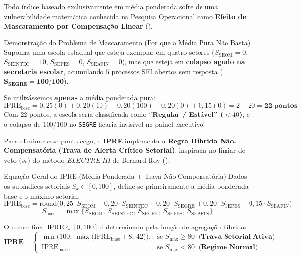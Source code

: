 \documentclass[9pt,a4paper]{extarticle}
\begin{document}
Todo índice baseado exclusivamente em média ponderada sofre de uma vulnerabilidade matemática conhecida na Pesquisa Operacional como \textbf{Efeito de Mascaramento por Compensação Linear} (\cite{roy1991, munda2008}).

\begin{alertbox}{Demonstração do Problema de Mascaramento (Por que a Média Pura Não Basta)}
Suponha uma escola estadual que esteja exemplar em quatro setores ($S_{\text{SEOM}} = 0$, $S_{\text{SEINTEC}} = 10$, $S_{\text{SEPES}} = 0$, $S_{\text{SEAFIN}} = 0$), mas que esteja em \textbf{colapso agudo na secretaria escolar}, acumulando $5$ processos SEI abertos sem resposta ($\mathbf{S_{\text{SEGRE}} = 100/100}$).

Se utilizássemos \textbf{apenas} a média ponderada pura:
\[
\text{IPRE}_{\text{base}} = 0{,}25(0) + 0{,}20(10) + 0{,}20(100) + 0{,}20(0) + 0{,}15(0) = 2 + 20 = \mathbf{22\text{ pontos}}
\]
Com $22$ pontos, a escola seria classificada como \textbf{``Regular / Estável'' ($< 40$)}, e o colapso de $100/100$ no \texttt{SEGRE} ficaria invisível no painel executivo!
\end{alertbox}

Para eliminar esse ponto cego, o \textbf{IPRE} implementa a \textbf{Regra Híbrida Não-Compensatória (Trava de Alerta Crítico Setorial)}, inspirada no limiar de veto ($v_k$) do método \emph{ELECTRE III} de Bernard Roy (\cite{roy1991}):

\begin{mathbox}{Equação Geral do IPRE (Média Ponderada + Trava Não-Compensatória)}
Dados os subíndices setoriais $S_k \in [0, 100]$, define-se primeiramente a média ponderada base e o máximo setorial:
\begin{equation}
\text{IPRE}_{\text{base}} = \text{round}\Big(0{,}25\cdot S_{\text{SEOM}} + 0{,}20\cdot S_{\text{SEINTEC}} + 0{,}20\cdot S_{\text{SEGRE}} + 0{,}20\cdot S_{\text{SEPES}} + 0{,}15\cdot S_{\text{SEAFIN}}\Big)
\end{equation}
\begin{equation}
S_{\max} = \max\big\{S_{\text{SEOM}}, \, S_{\text{SEINTEC}}, \, S_{\text{SEGRE}}, \, S_{\text{SEPES}}, \, S_{\text{SEAFIN}}\big\}
\end{equation}

O escore final $\text{IPRE} \in [0, 100]$ é determinado pela função de agregação híbrida:
\begin{equation}
\mathbf{\text{IPRE}} = \begin{cases}
\min\Big(100, \; \max\big(\text{IPRE}_{\text{base}} + 8, \, 42\big)\Big), & \text{se } S_{\max} \ge 80 \;\; \textbf{(Trava Setorial Ativa)} \\[6pt]
\text{IPRE}_{\text{base}}, & \text{se } S_{\max} < 80 \;\; \textbf{(Regime Normal)}
\end{cases}
\end{equation}
\end{mathbox}
\end{document}
